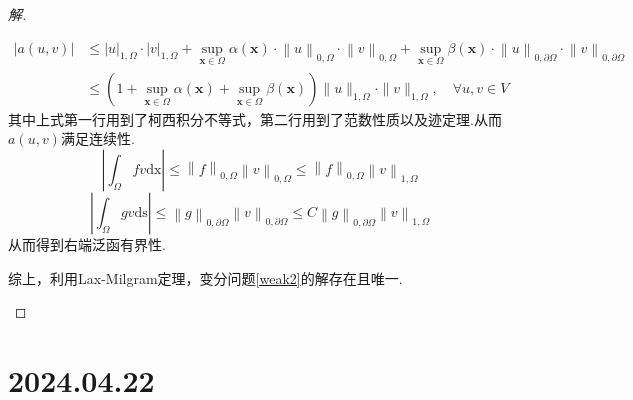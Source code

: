 \documentclass[12pt,a4paper]{article}
\begin{document}
\begin{enumerate}
\begin{proof}[解]
\begin{enumerate}
				\begin{equation*}
					\begin{aligned}
						|a(u,v)|&\leqslant\left|u\right|_{1,\Omega}\cdot\left|v\right|_{1,\Omega}+\sup_{\boldsymbol{x}\in\Omega}\alpha(\boldsymbol{x})\cdot\left\|u\right\|_{0,\Omega}\cdot\left\|v\right\|_{0,\Omega}+\sup_{\boldsymbol{x}\in\Omega}\beta(\boldsymbol{x})\cdot\left\|u\right\|_{0,\partial \Omega}\cdot\left\|v\right\|_{0,\partial \Omega}\\
						&\leqslant (1+\sup_{\boldsymbol{x}\in\Omega} \alpha(\boldsymbol{x})+\sup_{\boldsymbol{x}\in\Omega} \beta(\boldsymbol{x}))\|u\|_{1,\Omega}\cdot\|v\|_{1,\Omega},\quad\forall u,v\in V
					\end{aligned}
				\end{equation*}
				其中上式第一行用到了柯西积分不等式，第二行用到了范数性质以及迹定理.从而$a(u,v)$满足连续性.
				$$
				\left|\int_\Omega fv\mathrm{dx}\right|\leq\left\|f\right\|_{0,\Omega}\left\|v\right\|_{0,\Omega}\leq\left\|f\right\|_{0,\Omega}\left\|v\right\|_{1,\Omega}
				$$
				$$
				\left|\int_{\Omega}gv\mathrm{ds}\right|\leq\left\|g\right\|_{0,\partial\Omega}\left\|v\right\|_{0,\partial\Omega}\leq C\left\|g\right\|_{0,\partial\Omega}\left\|v\right\|_{1,\Omega}
				$$
				从而得到右端泛函有界性.
				
				综上，利用Lax-Milgram定理，变分问题\eqref{weak2}的解存在且唯一.
			\end{enumerate}
		\end{proof}
		
	\end{enumerate}
	\newpage
	
	\section*{2024.04.22}	
	
\end{document}

